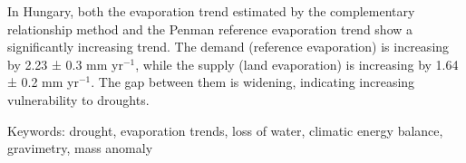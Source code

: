 In Hungary, both the evaporation trend estimated by the complementary relationship method and the Penman reference evaporation trend show a significantly increasing trend. The demand (reference evaporation) is increasing by 2.23 ± 0.3 mm yr$^{-1}$, while the supply (land evaporation) is increasing by 1.64 ± 0.2 mm yr$^{-1}$. The gap between them is widening, indicating increasing vulnerability to droughts.

Keywords:
drought, evaporation trends, loss of water, climatic energy balance, gravimetry, mass anomaly



\newpage{}
{}
\begin{flushleft}





\end{flushleft}

\noindent

